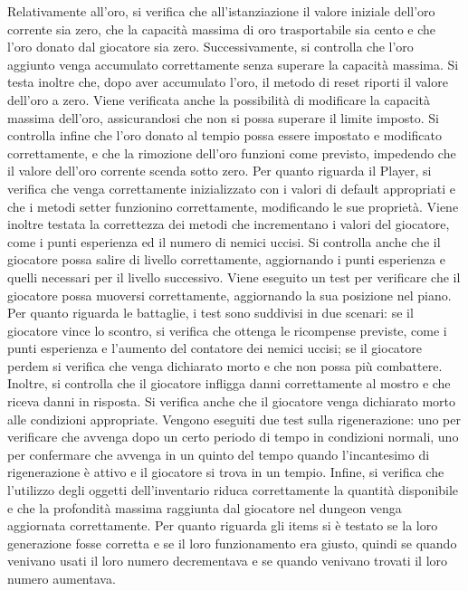 \documentclass{report}
\begin{document}
%
Relativamente all’oro, si verifica che all’istanziazione il valore iniziale dell’oro corrente sia zero, che la capacità massima di oro trasportabile sia cento e che l’oro donato dal giocatore sia zero. Successivamente, 
%
si controlla che l’oro aggiunto venga accumulato correttamente senza superare la capacità massima. Si testa inoltre che, dopo aver accumulato l’oro, il metodo di reset riporti il valore dell’oro a zero. \newline
%
Viene verificata anche la possibilità di modificare la capacità massima dell’oro, assicurandosi che non si possa superare il limite imposto. Si controlla infine che l’oro donato al tempio possa essere impostato e modificato correttamente,
%
e che la rimozione dell’oro funzioni come previsto, impedendo che il valore dell’oro corrente scenda sotto zero. \newline
%
Per quanto riguarda il Player, si verifica che venga correttamente inizializzato con i valori di default appropriati e che i metodi setter funzionino correttamente, modificando le sue proprietà.
%
Viene inoltre testata la correttezza dei metodi che incrementano i valori del giocatore, come i punti esperienza ed il numero di nemici uccisi. Si controlla anche che il giocatore possa salire di livello correttamente, 
%
aggiornando i punti esperienza e quelli necessari per il livello successivo. Viene eseguito un test per verificare che il giocatore possa muoversi correttamente, aggiornando la sua posizione nel piano. \newline
%
Per quanto riguarda le battaglie, i test sono suddivisi in due scenari: se il giocatore vince lo scontro, si verifica che ottenga le ricompense previste, come i punti esperienza e l’aumento del contatore dei nemici uccisi;
%
se il giocatore perdem si verifica che venga dichiarato morto e che non possa più combattere. Inoltre, si controlla che il giocatore infligga danni correttamente al mostro e che riceva danni in risposta. Si verifica anche 
%
che il giocatore venga dichiarato morto alle condizioni appropriate. \newline
%
Vengono eseguiti due test sulla rigenerazione: uno per verificare che avvenga dopo un certo periodo di tempo in condizioni normali, uno per confermare che avvenga in un quinto del tempo quando l’incantesimo di rigenerazione 
%
è attivo e il giocatore si trova in un tempio. \newline
%
Infine, si verifica che l’utilizzo degli oggetti dell’inventario riduca correttamente la quantità disponibile e che la profondità massima raggiunta dal giocatore nel dungeon venga aggiornata correttamente. \newline
%
Per quanto riguarda gli items si è testato se la loro generazione fosse corretta e se il loro funzionamento era giusto, quindi se quando venivano usati il loro numero decrementava e se quando venivano trovati il loro numero aumentava. \newline
%
\end{document}
